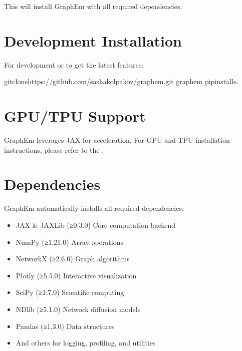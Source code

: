 \documentclass[letterpaper,10pt,english]{sphinxmanual}
\begin{document}
\sphinxAtStartPar
This will install GraphEm with all required dependencies.


\section{Development Installation}
\label{\detokenize{installation:development-installation}}
\sphinxAtStartPar
For development or to get the latest features:

\begin{sphinxVerbatim}[commandchars=\\\{\}]
gitclonehttps://github.com/sashakolpakov/graphem.git
graphem
pipinstall\PYGZhy{}e.
\end{sphinxVerbatim}


\section{GPU/TPU Support}
\label{\detokenize{installation:gpu-tpu-support}}
\sphinxAtStartPar
GraphEm leverages JAX for acceleration. For GPU and TPU installation instructions, please refer to the .


\section{Dependencies}
\label{\detokenize{installation:dependencies}}
\sphinxAtStartPar
GraphEm automatically installs all required dependencies:
\begin{itemize}
\item {} 
\sphinxAtStartPar
JAX \& JAXLib (≥0.3.0) \sphinxhyphen{} Core computation backend

\item {} 
\sphinxAtStartPar
NumPy (≥1.21.0) \sphinxhyphen{} Array operations

\item {} 
\sphinxAtStartPar
NetworkX (≥2.6.0) \sphinxhyphen{} Graph algorithms

\item {} 
\sphinxAtStartPar
Plotly (≥5.5.0) \sphinxhyphen{} Interactive visualization

\item {} 
\sphinxAtStartPar
SciPy (≥1.7.0) \sphinxhyphen{} Scientific computing

\item {} 
\sphinxAtStartPar
NDlib (≥5.1.0) \sphinxhyphen{} Network diffusion models

\item {} 
\sphinxAtStartPar
Pandas (≥1.3.0) \sphinxhyphen{} Data structures

\item {} 
\sphinxAtStartPar
And others for logging, profiling, and utilities

\end{itemize}
\end{document}
